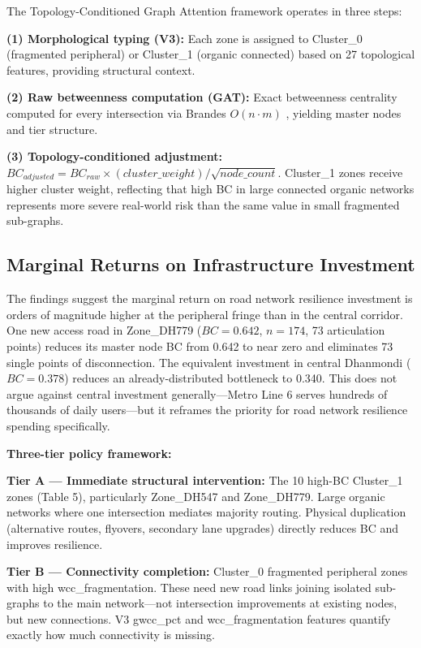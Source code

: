 \documentclass[sigconf, nonacm]{acmart}
\begin{document}
The Topology-Conditioned Graph Attention framework operates in three steps:

\textbf{(1) Morphological typing (V3):} Each zone is assigned to Cluster\_0 (fragmented peripheral) or Cluster\_1 (organic connected) based on 27 topological features, providing structural context.

\textbf{(2) Raw betweenness computation (GAT):} Exact betweenness centrality computed for every intersection via Brandes $O(n \cdot m)$ \cite{brandes2001}, yielding master nodes and tier structure.

\textbf{(3) Topology-conditioned adjustment:} $BC_{adjusted} = BC_{raw} \times (cluster\_weight) / \sqrt{node\_count}$. Cluster\_1 zones receive higher cluster weight, reflecting that high BC in large connected organic networks represents more severe real-world risk than the same value in small fragmented sub-graphs.

\subsection{Marginal Returns on Infrastructure Investment}

The findings suggest the marginal return on road network resilience investment is orders of magnitude higher at the peripheral fringe than in the central corridor. One new access road in Zone\_DH779 ($BC = 0.642$, $n = 174$, 73 articulation points) reduces its master node BC from 0.642 to near zero and eliminates 73 single points of disconnection. The equivalent investment in central Dhanmondi ($BC = 0.378$) reduces an already-distributed bottleneck to 0.340. This does not argue against central investment generally—Metro Line 6 serves hundreds of thousands of daily users—but it reframes the priority for road network resilience spending specifically.

\textbf{Three-tier policy framework:}

\textbf{Tier A — Immediate structural intervention:} The 10 high-BC Cluster\_1 zones (Table 5), particularly Zone\_DH547 and Zone\_DH779. Large organic networks where one intersection mediates majority routing. Physical duplication (alternative routes, flyovers, secondary lane upgrades) directly reduces BC and improves resilience.

\textbf{Tier B — Connectivity completion:} Cluster\_0 fragmented peripheral zones with high wcc\_fragmentation. These need new road links joining isolated sub-graphs to the main network—not intersection improvements at existing nodes, but new connections. V3 gwcc\_pct and wcc\_fragmentation features quantify exactly how much connectivity is missing.
\end{document}
